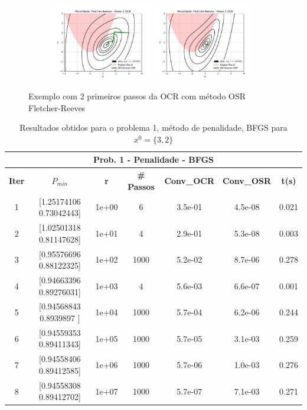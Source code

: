 \documentclass[10pt, a4paper]{article}
\begin{document}
\begin{figure}[H]
  \centering
  \begin{subfigure}[b]{\textwidth}
    \includegraphics[width=0.49\textwidth]{fig_p1/Penalidade_Fletcher-Reeves_1.pdf}
    \includegraphics[width=0.49\textwidth]{fig_p1/Penalidade_Fletcher-Reeves_2.pdf}
  \end{subfigure}
  \caption{Exemplo com 2 primeiros passos da OCR com método OSR Fletcher-Reeves }
\end{figure}

\vspace{5mm}
\begin{table}[H]
  \begin{center}
    \begin{tabular}{c|c|c|c|c|c|c}
      \multicolumn{7}{c}{\textbf{Prob. 1 - Penalidade - BFGS}}\\
      \hline
      \textbf{Iter} & \textbf{$P_{min}$} & \textbf{r} & \textbf{\# Passos} & \textbf{Conv\_OCR} & \textbf{Conv\_OSR} & \textbf{t(s)}\\
      \hline
        1& [1.25174106 0.73042443]& 1e+00& 6& 3.5e-01& 4.5e-08& 0.021      \\
        2& [1.02501318 0.81147628]& 1e+01& 4& 2.9e-01& 5.3e-08& 0.003\\
        3& [0.95576696 0.88122325]& 1e+02& 1000& 5.2e-02& 8.7e-06& 0.278\\
        4& [0.94663396 0.89276031]& 1e+03& 4& 5.6e-03& 6.6e-07& 0.001\\
        5& [0.94568843 0.8939897 ]& 1e+04& 1000& 5.7e-04& 6.2e-06& 0.244\\
        6& [0.94559353 0.89411343]& 1e+05& 1000& 5.7e-05& 3.1e-03& 0.259\\
        7& [0.94558406 0.89412585]& 1e+06& 1000& 5.7e-06& 1.0e-03& 0.276\\
        8& [0.94558308 0.89412702]& 1e+07& 1000& 5.7e-07& 7.1e-03& 0.271\\
    \end{tabular}
  \end{center}
  \caption{Resultados obtidos para o problema 1, método de penalidade, BFGS para $x^0=\{3,2\}$}
\end{table}
\end{document}
